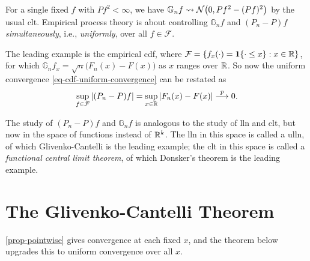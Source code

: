 \documentclass[a4paper,12pt]{article}
\begin{document}
\begin{remark}
	For a single fixed $f$ with $Pf^2<\infty$,
	we have
	$\mathbb G_nf\overset{}{\leadsto}\operatorname{\mathcal{N}}\bigl(0,Pf^2-(Pf)^2\bigr)$ by the usual \gls{clt}.
	Empirical process theory is about controlling $\mathbb G_nf$ and $(P_n-P)f$ \emph{simultaneously}, i.e., \emph{uniformly},
	over all $f\in\mathcal F$.
\end{remark}

\begin{example}
	The leading example is the empirical \gls{cdf}, where $\mathcal F=\{f_x(\cdot)=\mathbf{1}\{\cdot\le x\}:x\in\mathbb{R}\}$,
	for which $\mathbb G_n f_x=\sqrt n\bigl(F_n(x)-F(x)\bigr)$ as $x$ ranges over $\mathbb{R}$.
	So now the uniform convergence \eqref{eq-cdf-uniform-convergence} can be restated as
	\begin{align}
		\sup_{f\in\mathcal F}|(P_n-P)f|=\sup_{x\in\mathbb{R}}|F_n(x)-F(x)|\overset{p}{\longrightarrow}0.
	\end{align}
\end{example}

\begin{remark}
	The study of $(P_n-P)f$ and $\mathbb G_n f$ is analogous to the study of \gls{lln} and \gls{clt},
	but now in the space of functions instead of $\mathbb{R}^{k}$.
	The \gls{lln} in this space is called a \gls{ulln}, of which Glivenko-Cantelli is the leading example;
	the \gls{clt} in this space is called a \emph{functional central limit theorem}, of which Donsker's theorem is the leading example.
\end{remark}

\section{The Glivenko-Cantelli Theorem}

\autoref{prop-pointwise} gives convergence at each fixed $x$,
and the  theorem below upgrades this to uniform convergence over all $x$.
\end{document}
